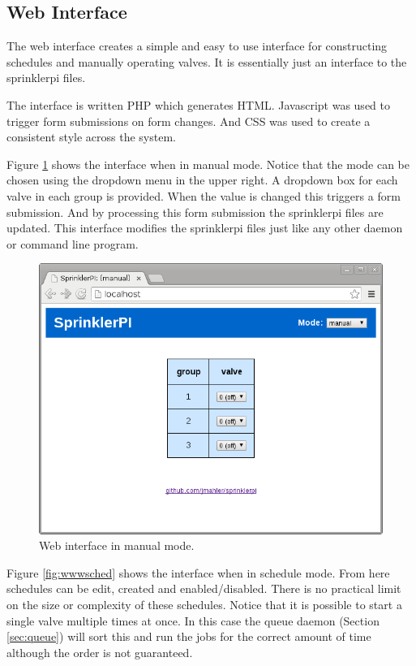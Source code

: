 \documentclass{article}
\begin{document}
\FloatBarrier
\subsection{Web Interface}
\label{sec:proxy}

The web interface creates a simple and easy to use interface for
constructing schedules and manually operating valves.
It is essentially just an interface to the sprinklerpi files.

The interface is written PHP which generates HTML.
Javascript was used to trigger form submissions on form changes.
And CSS was used to create a consistent style across the system.

Figure \ref{fig:wwwmanual} shows the interface when in manual mode.
Notice that the mode can be chosen using the dropdown menu in
the upper right.
A dropdown box for each valve in each group is provided.
When the value is changed this triggers a form submission.
And by processing this form submission the sprinklerpi files
are updated.
This interface modifies the sprinklerpi files just like any other
daemon or command line program.

\begin{figure}[h!]
\begin{center}
\includegraphics[scale=0.50]{../testing/img/www-manual_mode.png}
\end{center}
\caption{Web interface in manual mode.}
\label{fig:wwwmanual}
\end{figure}

\clearpage
Figure \ref{fig:wwwsched} shows the interface when in schedule mode.
From here schedules can be edit, created and enabled/disabled.
There is no practical limit on the size or complexity of these
schedules.
Notice that it is possible to start a single valve multiple times
at once.
In this case the queue daemon (Section \ref{sec:queue}) will sort
this and run the jobs for the correct amount of time although the
order is not guaranteed.
\end{document}
